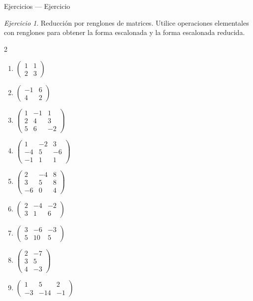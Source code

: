 \documentclass[aspectratio=169,11pt]{beamer}
\theoremstyle{remark}
\newtheorem{Ejer}[definicion]{Ejercicio}
\begin{document}
\begin{frame}[shrink=5]{Ejercicios — Ejercicio}
\footnotesize
\begin{Ejer} Reducción por renglones de matrices. Utilice operaciones elementales con renglones para obtener la forma escalonada y la forma escalonada reducida.

\begin{multicols}{2}
\begin{enumerate}[resume]
\item $\begin{pmatrix}1&1\\2&3\end{pmatrix}$
\item $\begin{pmatrix}-1&6\\4&2\end{pmatrix}$
\item $\begin{pmatrix}1&-1&1\\2&4&3\\5&6&-2\end{pmatrix}$
\item $\begin{pmatrix}1&-2&3\\-4&5&-6\\-1&1&1\end{pmatrix}$
\item $\begin{pmatrix}2&-4&8\\3&5&8\\-6&0&4\end{pmatrix}$
\item $\begin{pmatrix}2&-4&-2\\3&1&6\end{pmatrix}$
\item $\begin{pmatrix}3&-6&-3\\5&10&5\end{pmatrix}$
\item $\begin{pmatrix}2&-7\\3&5\\4&-3\end{pmatrix}$
\item $\begin{pmatrix}1&5&2\\-3&-14&-1\end{pmatrix}$
\end{enumerate}
\end{multicols}
\end{Ejer}
\end{frame}
\end{document}
